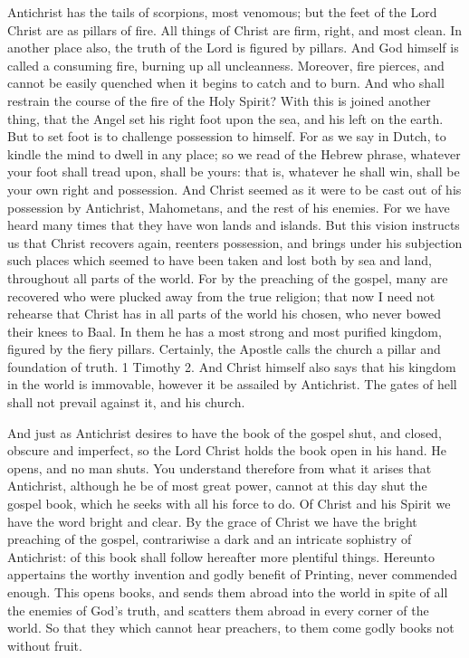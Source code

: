 Antichrist has the tails of scorpions, most venomous; but the feet of the Lord Christ are as pillars of fire. All things of Christ are firm, right, and most clean. In another place also, the truth of the Lord is figured by pillars. And God himself is called a consuming fire, burning up all uncleanness. Moreover, fire pierces, and cannot be easily quenched when it begins to catch and to burn. And who shall restrain the course of the fire of the Holy Spirit? With this is joined another thing, that the Angel set his right foot upon the sea, and his left on the earth. But to set foot is to challenge possession to himself. For as we say in Dutch, to kindle the mind to dwell in any place; so we read of the Hebrew phrase, whatever your foot shall tread upon, shall be yours: that is, whatever he shall win, shall be your own right and possession. And Christ seemed as it were to be cast out of his possession by Antichrist, Mahometans, and the rest of his enemies. For we have heard many times that they have won lands and islands. But this vision instructs us that Christ recovers again, reenters possession, and brings under his subjection such places which seemed to have been taken and lost both by sea and land, throughout all parts of the world. For by the preaching of the gospel, many are recovered who were plucked away from the true religion; that now I need not rehearse that Christ has in all parts of the world his chosen, who never bowed their knees to Baal. In them he has a most strong and most purified kingdom, figured by the fiery pillars. Certainly, the Apostle calls the church a pillar and foundation of truth. 1 Timothy 2. And Christ himself also says that his kingdom in the world is immovable, however it be assailed by Antichrist. The gates of hell shall not prevail against it, and his church.

And just as Antichrist desires to have the book of the gospel shut, and closed, obscure and imperfect, so the Lord Christ holds the book open in his hand. He opens, and no man shuts. You understand therefore from what it arises that Antichrist, although he be of most great power, cannot at this day shut the gospel book, which he seeks with all his force to do. Of Christ and his Spirit we have the word bright and clear. By the grace of Christ we have the bright preaching of the gospel, contrariwise a dark and an intricate sophistry of Antichrist: of this book shall follow hereafter more plentiful things. Hereunto appertains the worthy invention and godly benefit of Printing, never commended enough. This opens books, and sends them abroad into the world in spite of all the enemies of God’s truth, and scatters them abroad in every corner of the world. So that they which cannot hear preachers, to them come godly books not without fruit.

